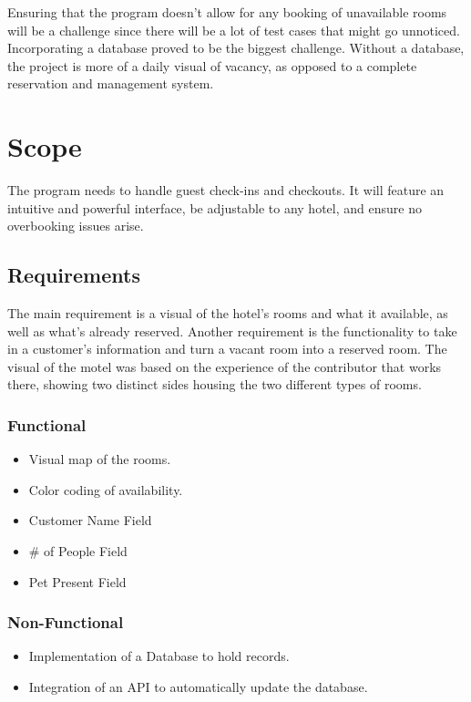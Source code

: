 \documentclass[10pt,conference,onecolumn,compsoc]{IEEEtran}
\begin{document}
Ensuring that the program doesn't allow for any booking of unavailable rooms will be a challenge since there will be a lot of test cases that might go unnoticed.
Incorporating a database proved to be the biggest challenge. Without a database, the project is more of a daily visual of vacancy, as opposed to a complete reservation and management system.


\section{Scope}
The program needs to handle guest check-ins and checkouts. It will feature an intuitive and powerful interface, be adjustable to any hotel, and ensure no overbooking issues arise.

\subsection{Requirements}
The main requirement is a visual of the hotel's rooms and what it available, as well as what's already reserved. Another requirement is the functionality to take in a customer's information and turn a vacant room into a reserved room. The visual of the motel was based on the experience of the contributor that works there, showing two distinct sides housing the two different types of rooms. 

\subsubsection{Functional}
\begin{itemize}
\item Visual map of the rooms.
\item Color coding of availability.
\item Customer Name Field
\item \# of People Field
\item Pet Present Field
\end{itemize}

\subsubsection{Non-Functional}
\begin{itemize}
\item Implementation of a Database to hold records. 
\item Integration of an API to automatically update the database.
\end{itemize}
\end{document}
